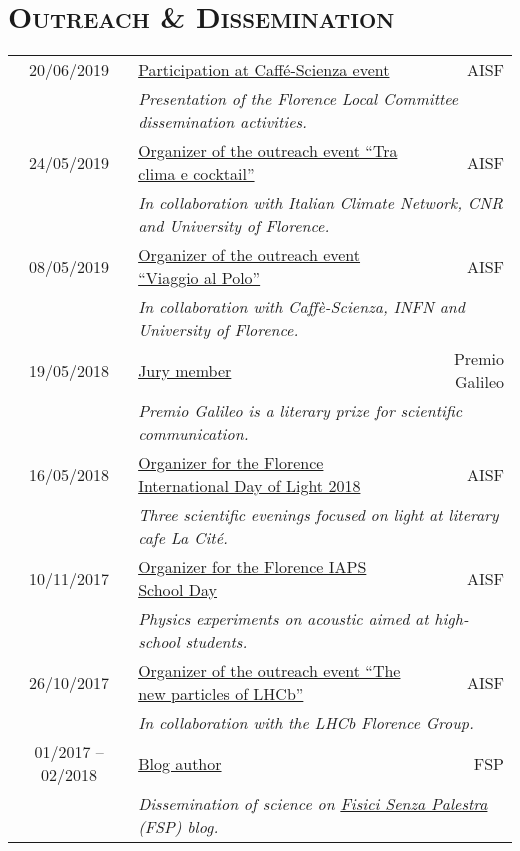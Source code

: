 \section*{\textsc{Outreach \& Dissemination}}
\begin{tabular*}{\textwidth}{cl @{\extracolsep{\fill}} r}
    {\small 20/06/2019} & \underline{Participation at Caffé-Scienza event} & {\small AISF}\\
    & \multicolumn{2}{l}{\small \emph {Presentation of the Florence Local Committee dissemination activities.}}\\ [3mm]
        
    {\small 24/05/2019} & \ul{Organizer of the outreach event ``Tra clima e cocktail''} & {\small AISF}\\
    & \multicolumn{2}{l}{\small \emph {In collaboration with Italian Climate Network, CNR and University of Florence.}}\\ [3mm]
        
    {\small 08/05/2019} & \ul{Organizer of the outreach event ``Viaggio al Polo''} & {\small AISF}\\
    & \multicolumn{2}{l}{\small \emph {In collaboration with Caffè-Scienza, INFN and University of Florence.}}\\ [3mm]

    {\small 19/05/2018} & \ul{Jury member} & {\small Premio Galileo}\\
    & \multicolumn{2}{l}{\small \emph {Premio Galileo is a literary prize for scientific communication.}}\\ [3mm]

    {\small 16/05/2018} & \ul{Organizer for the Florence International Day of Light 2018} & {\small AISF}\\
    & \multicolumn{2}{l}{\small \emph {Three scientific evenings focused on light at literary cafe La Cité.}}\\ [3mm]

    {\small 10/11/2017} & \ul{Organizer for the Florence IAPS School Day} & {\small AISF}\\
    & \multicolumn{2}{l}{\small \emph {Physics experiments on acoustic aimed at high-school students.}}\\ [3mm]

    {\small 26/10/2017} & \ul{Organizer of the outreach event ``The new particles of LHCb''} & {\small AISF}\\
    & \multicolumn{2}{l}{\small \emph {In collaboration with the LHCb Florence Group.}}\\ [3mm]
    
    {\small 01/2017 -- 02/2018} & \ul{Blog author} & {\small FSP}\\
    & \multicolumn{2}{l}{\small \emph {Dissemination of science on \href{https://www.fisicisenzapalestra.com}{\textit{Fisici Senza Palestra}} (FSP) blog.}}
\end{tabular*}